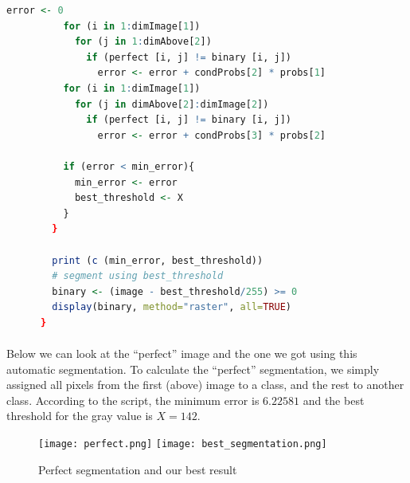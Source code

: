 \begin{lstlisting}[language=R, caption=Automatic segmentation using Bayes]
          error <- 0
          for (i in 1:dimImage[1])
            for (j in 1:dimAbove[2])
              if (perfect [i, j] != binary [i, j])
                error <- error + condProbs[2] * probs[1]
          for (i in 1:dimImage[1])
            for (j in dimAbove[2]:dimImage[2])
              if (perfect [i, j] != binary [i, j])
                error <- error + condProbs[3] * probs[2]
            
          if (error < min_error){
            min_error <- error
            best_threshold <- X
          }
        }
        
        print (c (min_error, best_threshold))
        # segment using best_threshold
        binary <- (image - best_threshold/255) >= 0
        display(binary, method="raster", all=TRUE)
      }
\end{lstlisting}

\paragraph{}
Below we can look at the ``perfect'' image and the one we got using this automatic segmentation.
To calculate the ``perfect'' segmentation, we simply assigned all pixels from the first (above) image to a class, and the rest to another class.
According to the script, the minimum error is $6.22581$ and the best threshold for the gray value is $X = 142$.

\begin{figure}[h]
    \centering
    \texttt{[image: perfect.png]}
    \texttt{[image: best\_segmentation.png]}
    \caption{Perfect segmentation and our best result}
    \label{}
\end{figure}